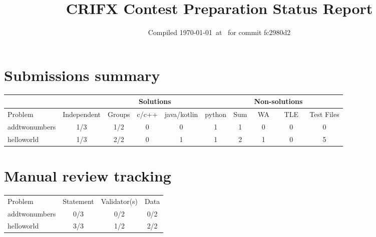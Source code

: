 \documentclass{article}%
\title{CRIFX Contest Preparation Status Report}%
\date{Compiled \today~at \DTMcurrenttime\DTMcurrentzone~for commit fc2980d2}%
\begin{document}
%
\normalsize%
\maketitle%
\section{Submissions summary}%
\label{sec:Submissionssummary}%
\begin{tabular}{|l|c|c|c|c|c|c|c|c|c|}%
\hline%
\rowcolor{cyan}%
&\multicolumn{6}{c}{{\tiny Solutions}}&\multicolumn{2}{|c|}{{\tiny Non-solutions}}&\\%
\hline%
\rowcolor{cyan}%
{\tiny Problem}&{\tiny Independent}&{\tiny Groups}&{\tiny c/c++}&{\tiny java/kotlin}&{\tiny python}&{\tiny Sum}&{\tiny WA}&{\tiny TLE}&{\tiny Test Files}\\%
\hline%
addtwonumbers&\cellcolor{red}1/3&\cellcolor{red}1/2&0&0&1&1&0&0&0\\%
\hline%
helloworld&\cellcolor{red}1/3&\cellcolor{green}2/2&0&1&1&2&1&0&5\\%
\hline%
\end{tabular}

%
\section{Manual review tracking}%
\label{sec:Manualreviewtracking}%
\begin{tabular}{|l|c|c|c|}%
\hline%
\rowcolor{cyan}%
{\tiny Problem}&{\tiny Statement}&{\tiny Validator(s)}&{\tiny Data}\\%
addtwonumbers&\cellcolor{red}0/3&\cellcolor{red}0/2&\cellcolor{red}0/2\\%
\hline%
helloworld&\cellcolor{green}3/3&\cellcolor{red}1/2&\cellcolor{green}2/2\\%
\hline%
\end{tabular}

%
\end{document}
